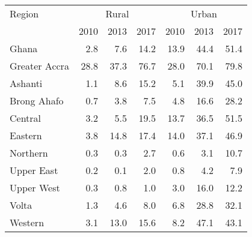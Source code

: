 \begin{tabular}{l r r r r r r }
\toprule
Region & \multicolumn{3}{c}{Rural} & \multicolumn{3}{c}{Urban} \\
\cmidrule(lr){2-4}
\cmidrule(lr){5-7}
& 2010 & 2013 & 2017 & 2010 & 2013 & 2017 \\
\midrule
Ghana  &  2.8  &  7.6  &  14.2  &  13.9  &  44.4  &  51.4 \\
Greater Accra  &  28.8  &  37.3  &  76.7  &  28.0  &  70.1  &  79.8 \\
Ashanti  &  1.1  &  8.6  &  15.2  &  5.1  &  39.9  &  45.0 \\
Brong Ahafo  &  0.7  &  3.8  &  7.5  &  4.8  &  16.6  &  28.2 \\
Central  &  3.2  &  5.5  &  19.5  &  13.7  &  36.5  &  51.5 \\
Eastern  &  3.8  &  14.8  &  17.4  &  14.0  &  37.1  &  46.9 \\
Northern  &  0.3  &  0.3  &  2.7  &  0.6  &  3.1  &  10.7 \\
Upper East  &  0.2  &  0.1  &  2.0  &  0.8  &  4.2  &  7.9 \\
Upper West  &  0.3  &  0.8  &  1.0  &  3.0  &  16.0  &  12.2 \\
Volta  &  1.3  &  4.6  &  8.0  &  6.8  &  28.8  &  32.1 \\
Western  &  3.1  &  13.0  &  15.6  &  8.2  &  47.1  &  43.1 \\
\bottomrule
\end{tabular}
